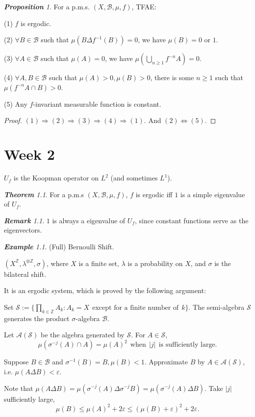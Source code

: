 \documentclass[10pt, a4paper, oneside]{report}
\numberwithin{equation}{chapter}
\theoremstyle{remark}
\newtheorem{theorem}[definition]{\bf{Theorem}}
\newtheorem{proposition}[definition]{\bf{Proposition}}
\theoremstyle{remark}
\newtheorem{remark}{\bf{Remark}}[chapter]
\newtheorem{example}{\bf{Example}}[chapter]
\begin{document}
\begin{proposition}
    For a p.m.s. $(X,\mathcal{B},\mu,f)$, TFAE:

    (1) $f$ is ergodic.

    (2) $\forall B\in\mathcal{B}$ such that $\mu(B\Delta f^{-1}(B))=0$, we have $\mu(B)=0$ or $1$.

    (3) $\forall A\in\mathcal{B}$ such that $\mu(A)=0$, we have $\mu(\bigcup\limits_{n\geqslant 1}f^{-n}A)=0$.

    (4) $\forall A,B\in\mathcal{B}$ such that $\mu(A)>0,\mu(B)>0$, there is some $n\geqslant 1$ such that $\mu(f^{-n}A\cap B)>0$.

    (5) Any $f$-invariant measurable function is constant.
\end{proposition}
    
\begin{proof}
    $(1)\Rightarrow (2)\Rightarrow (3)\Rightarrow (4)\Rightarrow (1)$. And $(2)\Leftrightarrow(5)$.
\end{proof}

\chapter{Week 2}
    $U_f$ is the Koopman operator on $L^2$ (and sometimes $L^1$).

\begin{theorem}
    For a p.m.s $(X,\mathcal{B},\mu,f)$, $f$ is ergodic iff $1$ is a simple eigenvalue of $U_f$.
\end{theorem}

\begin{remark}
    $1$ is always a eigenvalue of $U_f$, since constant functions serve as the eigenvectors.
\end{remark}

\begin{example}
    (Full) Bernoulli Shift.

    $(X^\mathbb{Z},\lambda^{\otimes\mathbb{Z}},\sigma)$, where $X$ is a finite set, $\lambda$ is a probability on $X$, and $\sigma$ is the bilateral shift.

    It is an ergodic system, which is proved by the following argument:

    Set $\mathcal{S}:=\{\prod\limits_{k\in\mathbb{Z}}A_k:A_k=X ~~\text{except for a finite number of}~~k\}$. The semi-algebra $\mathcal{S}$ generates the product $\sigma$-algebra $\mathcal{B}$.

    Let $\mathcal{A}(\mathcal{S})$ be the algebra generated by $\mathcal{S}$. For $A\in\mathcal{S}$, $$\mu(\sigma^{-j}(A)\cap A)=\mu(A)^2 ~~\text{when}~~ |j| ~~\text{is sufficiently large.}$$

    Suppose $B\in\mathcal{B}$ and $\sigma^{-1}(B)=B,\mu(B)<1$. Approximate $B$ by $A\in\mathcal{A}(\mathcal{S})$, i.e. $\mu(A\Delta B)<\varepsilon$.

    Note that $\mu(A\Delta B)=\mu(\sigma^{-j}(A)\Delta \sigma^{-j}B)=\mu(\sigma^{-j}(A)\Delta B)$. Take $|j|$ sufficiently large,
    $$\mu(B)\leqslant \mu(A)^2+2\varepsilon\leqslant (\mu(B)+\varepsilon)^2+2\varepsilon.$$
\end{example}
\end{document}
